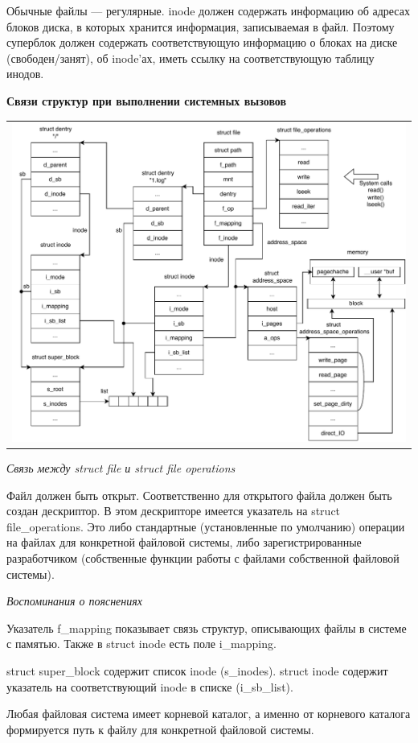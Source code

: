 Обычные файлы --- регулярные. inode должен содержать информацию об адресах блоков диска, в которых хранится информация, записываемая в файл. Поэтому суперблок должен содержать соответствующую информацию о блоках на диске (свободен/занят), об inode'ах, иметь ссылку на соответствующую таблицу инодов.

\textbf{Связи структур при выполнении системных вызовов}
\begin{table}[h!]
  \centering
  \begin{tabular}{p{1\linewidth}}
    \centering
    \includegraphics[width=0.8\linewidth]{./images/systemcalls_connect.pdf}
  \end{tabular}
\end{table}

\newpage

\textit{Связь между struct file и struct file operations}

Файл должен быть открыт. Соответственно для открытого файла должен быть создан дескриптор. В этом дескрипторе имеется указатель на struct file\_operations. Это либо стандартные (установленные по умолчанию) операции на файлах для конкретной файловой системы, либо зарегистрированные разработчиком (собственные функции работы с файлами собственной файловой системы).

\textit{Воспоминания о пояснениях}

Указатель f\_mapping показывает связь структур, описывающих файлы в системе с памятью. Также в struct inode есть поле i\_mapping.

struct super\_block содержит список inode (s\_inodes). struct inode содержит указатель на соответствующий inode в списке (i\_sb\_list).

Любая файловая система имеет корневой каталог, а именно от корневого каталога формируется путь к файлу для конкретной файловой системы.

